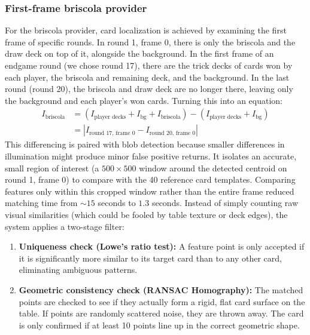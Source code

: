 \documentclass[11pt,a4paper]{article}
\begin{document}
\subsubsection{First-frame briscola provider}
For the briscola provider, card localization is achieved by examining the
first frame of specific rounds. In round 1, frame 0, there is only the briscola
and the draw deck on top of it, alongside the background. In the first frame of
 an endgame round (we chose round 17), there are the trick decks of cards won by
each player, the briscola and remaining deck, and the background. In the last
round (round 20), the briscola and draw deck are no longer there, leaving only
the background and each player's won cards. Turning this into an equation:
\begin{align}
    I_{\text{briscola}} &= (I_{\text{player decks}} + I_{\text{bg}} + I_{\text{briscola}}) - (I_{\text{player decks}} + I_{\text{bg}}) \nonumber \\
    &= \left| I_{\text{round 17, frame 0}} - I_{\text{round 20, frame 0}} \right|
\end{align}
This differencing is paired with blob detection because smaller differences in
illumination might produce minor false positive returns. It isolates an
accurate, small region of interest (a $500 \times 500$ window around the
detected centroid on round 1, frame 0) to compare with the 40 reference card
templates. Comparing features only within this cropped window rather than the
entire frame reduced matching time from $\sim 15$ seconds to $1.3$ seconds. Instead of simply counting raw visual similarities (which could be fooled by table texture or deck edges), the system applies a two-stage filter:
\begin{enumerate}
    \item \textbf{Uniqueness check (Lowe's ratio test):} A feature point is only accepted if it is significantly more similar to its target card than to any other card, eliminating ambiguous patterns.
    \item \textbf{Geometric consistency check (RANSAC Homography):} The matched points are checked to see if they actually form a rigid, flat card surface on the table. If points are randomly scattered noise, they are thrown away. The card is only confirmed if at least 10 points line up in the correct geometric shape.
\end{enumerate}
\end{document}
